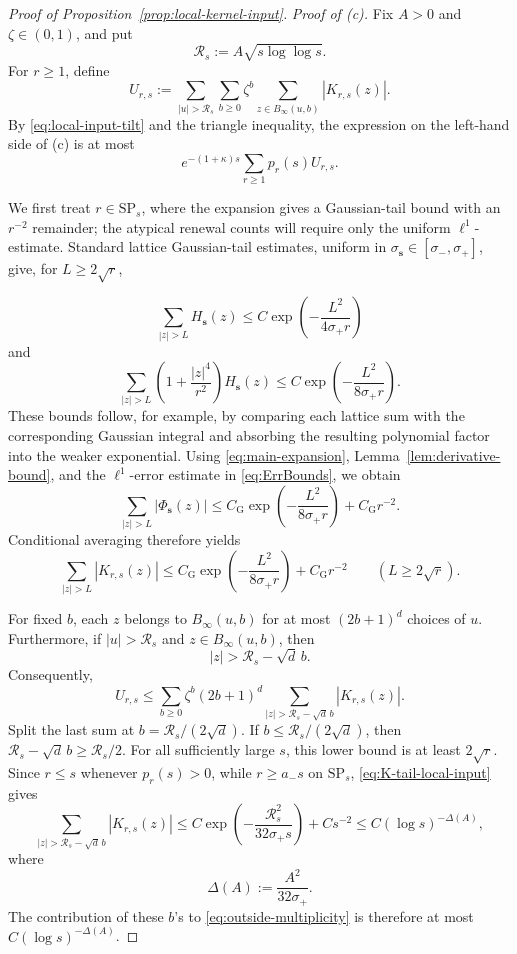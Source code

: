 \documentclass[letterpaper,11pt,reqno]{amsart}
\theoremstyle{definition}
\begin{document}
\begin{proof}[Proof of Proposition~\ref{prop:local-kernel-input}]
\smallskip
\noindent\textit{Proof of {\rm(c)}.}
Fix \(A>0\) and \(\zeta\in(0,1)\), and put
\[
\mathcal R_s:=A\sqrt{s\log\log s}.
\]
For \(r\ge1\), define
\[
U_{r,s}
:=
\sum_{|u|>\mathcal R_s}\sum_{b\ge0}\zeta^b
\sum_{z\in B_\infty(u,b)}|K_{r,s}(z)|.
\]
By \eqref{eq:local-input-tilt} and the triangle inequality, the expression on the
left-hand side of (c) is at most
\begin{equation}\label{eq:outside-reduction}
e^{-(1+\kappa)s}\sum_{r\ge1}p_r(s)U_{r,s}.
\end{equation}



We first treat \(r\in\mathrm{SP}_s\), where the expansion gives a Gaussian-tail bound with an
\(r^{-2}\) remainder; the atypical renewal counts will require only the uniform
\(\ell^1\)-estimate. Standard lattice Gaussian-tail estimates, uniform in
\(\sigma_{\mathbf s}\in[\sigma_-,\sigma_+]\), give, for \(L\ge2\sqrt r\),

\[
\sum_{|z|>L}H_{\mathbf s}(z)
\le
C\exp\!\left(-\frac{L^2}{4\sigma_+r}\right)
\]
and
\[
\sum_{|z|>L}
\left(1+\frac{|z|^4}{r^2}\right)H_{\mathbf s}(z)
\le
C\exp\!\left(-\frac{L^2}{8\sigma_+r}\right).
\]
These bounds follow, for example, by comparing each lattice sum with the corresponding
Gaussian integral and absorbing the resulting polynomial factor into the weaker exponential.
Using \eqref{eq:main-expansion}, Lemma~\ref{lem:derivative-bound}, and the
\(\ell^1\)-error estimate in \eqref{eq:ErrBounds}, we obtain
\[
\sum_{|z|>L}|\Phi_{\mathbf s}(z)|
\le
C_{\mathrm G}\exp\!\left(-\frac{L^2}{8\sigma_+r}\right)
+C_{\mathrm G}r^{-2}.
\]
Conditional averaging therefore yields
\begin{equation}\label{eq:K-tail-local-input}
\sum_{|z|>L}|K_{r,s}(z)|
\le
C_{\mathrm G}\exp\!\left(-\frac{L^2}{8\sigma_+r}\right)
+C_{\mathrm G}r^{-2}
\qquad (L\ge2\sqrt r).
\end{equation}

For fixed \(b\), each \(z\) belongs to \(B_\infty(u,b)\) for at most
\((2b+1)^d\) choices of \(u\). Furthermore, if \(|u|>\mathcal R_s\) and
\(z\in B_\infty(u,b)\), then
\[
|z|>\mathcal R_s-\sqrt d\,b.
\]
Consequently,
\begin{equation}\label{eq:outside-multiplicity}
U_{r,s}
\le
\sum_{b\ge0}\zeta^b(2b+1)^d
\sum_{|z|>\mathcal R_s-\sqrt d\,b}|K_{r,s}(z)|.
\end{equation}
Split the last sum at \(b=\mathcal R_s/(2\sqrt d)\). If
\(b\le\mathcal R_s/(2\sqrt d)\), then
\(\mathcal R_s-\sqrt d\,b\ge\mathcal R_s/2\). For all sufficiently large \(s\),
this lower bound is at least \(2\sqrt r\). Since \(r\le s\) whenever
\(p_r(s)>0\), while \(r\ge a_-s\) on \(\mathrm{SP}_s\),
\eqref{eq:K-tail-local-input} gives
\[
\sum_{|z|>\mathcal R_s-\sqrt d\,b}|K_{r,s}(z)|
\le
C\exp\!\left(-\frac{\mathcal R_s^2}{32\sigma_+s}\right)+Cs^{-2}
\le
C(\log s)^{-\Delta(A)},
\]
where
\[
\Delta(A):=\frac{A^2}{32\sigma_+}.
\]
The contribution of these \(b\)'s to \eqref{eq:outside-multiplicity} is therefore at most
\(C(\log s)^{-\Delta(A)}\).


\end{proof}
\end{document}
